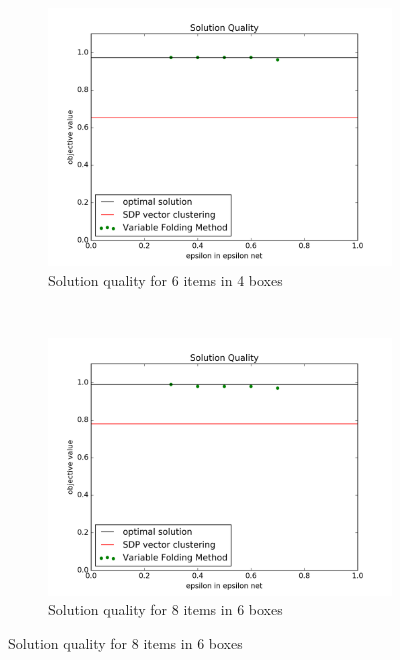 \documentclass[12pt]{article} %
\begin{document}
\begin{figure}[ht!]
	\begin{subfigure}[b]{0.45\textwidth}
	\centering
	\includegraphics[width=\textwidth]{solution_epsilon_n6m4}
	\caption{Solution quality for 6 items in 4 boxes}
	\label{n6m4}
	\end{subfigure}
	~
	\begin{subfigure}[b]{0.45\textwidth}
	\centering
	\includegraphics[width=\textwidth]{solution_epsilon_n8m6}
	\caption{Solution quality for 8 items in 6 boxes}
	\label{n8m6}
	\end{subfigure}


\end{figure}
\end{document}
